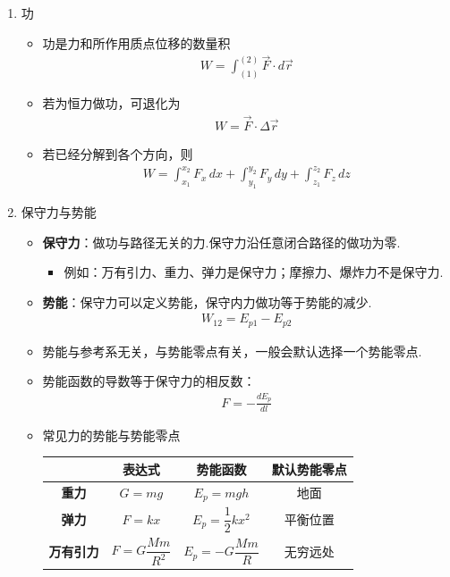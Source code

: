 \begin{enumerate}
	\item 功
	\begin{itemize}
		\item 功是力和所作用质点位移的数量积
		\begin{align*}
			W = \int_{(1)}^{(2)} \vec{F} \cdot d\vec{r}
		\end{align*}
		\item 若为恒力做功，可退化为
		\begin{align*}
			W = \vec{F} \cdot \Delta \vec{r}
		\end{align*}
		\item 若已经分解到各个方向，则
		\begin{align*}
			W = \int_{x_1}^{x_2} F_x\,dx
			+ \int_{y_1}^{y_2} F_y\,dy
			+ \int_{z_1}^{z_2} F_z\,dz
		\end{align*}
	\end{itemize}
	
	\item 保守力与势能
	\begin{itemize}
	\item \textbf{保守力}：做功与路径无关的力.保守力沿任意闭合路径的做功为零.
	\begin{itemize}
		\item 例如：万有引力、重力、弹力是保守力；摩擦力、爆炸力不是保守力.
	\end{itemize}
	\item \textbf{势能}：保守力可以定义势能，保守内力做功等于势能的减少.
	\begin{align*}
		W_{12} = E_{p1} - E_{p2}
	\end{align*}
	\item 势能与参考系无关，与势能零点有关，一般会默认选择一个势能零点.
	\item 势能函数的导数等于保守力的相反数：
	\begin{align*}
		F = -\frac{dE_p}{dl}
	\end{align*}
	
	
	\item 常见力的势能与势能零点
	\begin{table}[H]
		\centering
		\begin{tabular}{cccc}
			\toprule
			& \textbf{表达式} & \textbf{势能函数} & \textbf{默认势能零点} \\
			\midrule
			\textbf{重力} & $G = mg$ & $E_p = mgh$ & 地面 \\
			\textbf{弹力} & $F = kx$ & $E_p = \dfrac{1}{2}kx^2$ & 平衡位置 \\
			\textbf{万有引力} & $F = G\dfrac{Mm}{R^2}$ & $E_p = -G\dfrac{Mm}{R}$ & 无穷远处 \\
			\bottomrule
		\end{tabular}
	\end{table}
	

\end{itemize}
\end{enumerate}
